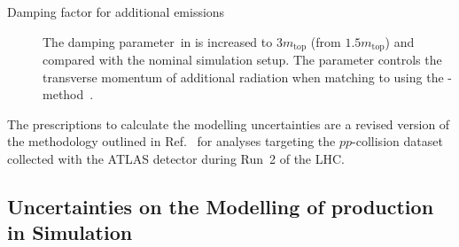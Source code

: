 \begin{description}
\item[Damping factor for additional emissions] The damping parameter~\hdamp in
  \POWHEGBOX[v2] is increased to $3 m_\text{top}$ (from $1.5 m_\text{top}$) and
  compared with the nominal simulation setup. The \hdamp parameter controls the
  transverse momentum of additional radiation when matching \POWHEGBOX[v2] to
  \PYTHIA[8] using the
  \POWHEG-method~\cite{ATL-PHYS-PUB-2016-020,ATL-PHYS-PUB-2020-023}.

\end{description}
The prescriptions to calculate the \ttbar modelling uncertainties are a revised
version of the methodology outlined in Ref.~\cite{ATL-PHYS-PUB-2020-023} for
analyses targeting the $pp$-collision dataset collected with the ATLAS detector
during Run~2 of the LHC.



\subsection{Uncertainties on the Modelling of \Zjets production in Simulation}%
\label{app:zjets_uncertainties}

